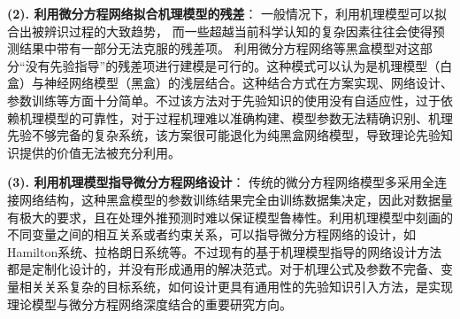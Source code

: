 \textbf{(2). 利用微分方程网络拟合机理模型的残差}：
一般情况下，利用机理模型可以拟合出被辨识过程的大致趋势，
而一些超越当前科学认知的复杂因素往往会使得预测结果中带有一部分无法克服的残差项。
利用微分方程网络等黑盒模型对这部分“没有先验指导”的残差项进行建模是可行的。这种模式可以认为是机理模型（白盒）与神经网络模型（黑盒）的浅层结合。这种结合方式在方案实现、网络设计、参数训练等方面十分简单。不过该方法对于先验知识的使用没有自适应性，过于依赖机理模型的可靠性，对于过程机理难以准确构建、模型参数无法精确识别、机理先验不够完备的复杂系统，该方案很可能退化为纯黑盒网络模型，导致理论先验知识提供的价值无法被充分利用。

\textbf{(3). 利用机理模型指导微分方程网络设计}：
传统的微分方程网络模型多采用全连接网络结构，这种黑盒模型的参数训练结果完全由训练数据集决定，因此对数据量有极大的要求，且在处理外推预测时难以保证模型鲁棒性。利用机理模型中刻画的不同变量之间的相互关系或者约束关系，可以指导微分方程网络的设计，如Hamilton系统、拉格朗日系统等。不过现有的基于机理模型指导的网络设计方法都是定制化设计的，并没有形成通用的解决范式。对于机理公式及参数不完备、变量相关关系复杂的目标系统，如何设计更具有通用性的先验知识引入方法，是实现理论模型与微分方程网络深度结合的重要研究方向。
